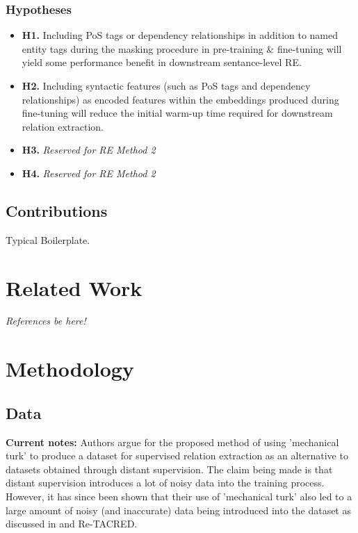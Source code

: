 \documentclass[11pt]{article}
\begin{document}
\subsubsection{Hypotheses}

\begin{itemize}
    \item \textbf{H1.} Including PoS tags or dependency relationships in addition to named entity tags during the masking procedure in pre-training \& fine-tuning will yield some performance benefit in downstream sentance-level RE.
    \item \textbf{H2.} Including syntactic features (such as PoS tags and dependency relationships) as encoded features within the embeddings produced during fine-tuning will reduce the initial warm-up time required for downstream relation extraction.
    \item \textbf{H3.} \emph{Reserved for RE Method 2}
    \item \textbf{H4.} \emph{Reserved for RE Method 2}
\end{itemize}

\subsection{Contributions}

Typical Boilerplate.

\section{Related Work}

\emph{References be here!}

\section{Methodology}

\subsection{Data}

\textbf{Current notes:} Authors argue for the proposed method of using 'mechanical turk' to produce a dataset for supervised relation extraction as an alternative to datasets obtained through distant supervision. The claim being made is that distant supervision introduces a lot of noisy data into the training process. However, it has since been shown that their use of 'mechanical turk' also led to a large amount of noisy (and inaccurate) data being introduced into the dataset as discussed in \cite{alt, garbeyszak and henning, 2020} and Re-TACRED.
\end{document}
